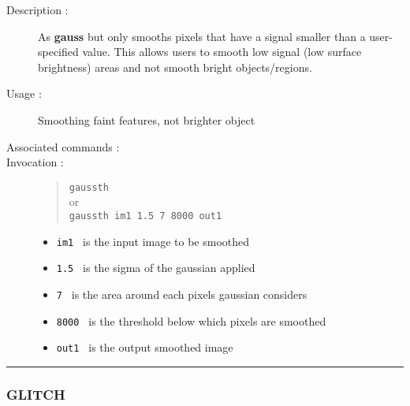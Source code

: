 \begin{description}

\item[Description :] As {\bf gauss} but only smooths pixels that have a
signal smaller than a user-specified value.  This allows users to
smooth low signal (low surface brightness) areas and not smooth bright
objects/regions.

\item[Usage :] Smoothing faint features, not brighter object
\item[Associated commands :] {\tt {}}
\item[Invocation :]

\begin{quote}{\tt  gaussth }\\
or \\
{\tt gaussth im1 1.5 7 8000 out1 }
\end{quote}

\begin{itemize}

\item {\tt im1 } is the input image to be smoothed
\item {\tt 1.5 } is the sigma of the gaussian applied
\item {\tt 7 } is the area around each pixels gaussian considers
\item {\tt 8000 } is the threshold below which pixels are smoothed
\item {\tt out1 } is the output smoothed image
\end{itemize}\end{description}

\hrule 
\subsubsection*{\label{GLITCH}GLITCH}

